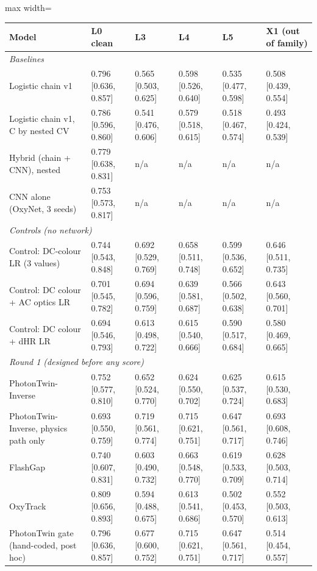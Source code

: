 {\scriptsize
\setlength{\tabcolsep}{2.5pt}
\begin{adjustbox}{max width=\linewidth}
\begin{tabular}{p{3.4cm}lllll}
\toprule
Model & L0 clean & L3 & L4 & L5 & X1 (out of family) \\
\midrule
\multicolumn{6}{l}{\emph{Baselines}} \\
Logistic chain v1 & 0.796 [0.636, 0.857] & 0.565 [0.503, 0.625] & 0.598 [0.526, 0.640] & 0.535 [0.477, 0.598] & 0.508 [0.439, 0.554] \\
Logistic chain v1, C by nested CV & 0.786 [0.596, 0.860] & 0.541 [0.476, 0.606] & 0.579 [0.518, 0.615] & 0.518 [0.467, 0.574] & 0.493 [0.424, 0.539] \\
Hybrid (chain + CNN), nested & 0.779 [0.638, 0.831] & n/a & n/a & n/a & n/a \\
CNN alone (OxyNet, 3 seeds) & 0.753 [0.573, 0.817] & n/a & n/a & n/a & n/a \\
\multicolumn{6}{l}{\emph{Controls (no network)}} \\
Control: DC-colour LR (3 values) & 0.744 [0.543, 0.848] & 0.692 [0.529, 0.769] & 0.658 [0.511, 0.748] & 0.599 [0.536, 0.652] & 0.646 [0.511, 0.735] \\
Control: DC colour + AC optics LR & 0.701 [0.545, 0.782] & 0.694 [0.596, 0.759] & 0.639 [0.581, 0.687] & 0.566 [0.502, 0.638] & 0.643 [0.560, 0.701] \\
Control: DC colour + dHR LR & 0.694 [0.546, 0.793] & 0.613 [0.498, 0.722] & 0.615 [0.540, 0.666] & 0.590 [0.517, 0.684] & 0.580 [0.469, 0.665] \\
\multicolumn{6}{l}{\emph{Round 1 (designed before any score)}} \\
PhotonTwin-Inverse & 0.752 [0.577, 0.810] & 0.652 [0.524, 0.770] & 0.624 [0.550, 0.702] & 0.625 [0.537, 0.724] & 0.615 [0.530, 0.683] \\
PhotonTwin-Inverse, physics path only & 0.693 [0.550, 0.759] & 0.719 [0.561, 0.774] & 0.715 [0.621, 0.751] & 0.647 [0.561, 0.717] & 0.693 [0.608, 0.746] \\
FlashGap & 0.740 [0.607, 0.831] & 0.603 [0.490, 0.732] & 0.663 [0.548, 0.770] & 0.619 [0.533, 0.709] & 0.628 [0.503, 0.714] \\
OxyTrack & 0.809 [0.656, 0.893] & 0.594 [0.488, 0.675] & 0.613 [0.541, 0.686] & 0.502 [0.453, 0.570] & 0.552 [0.503, 0.613] \\
PhotonTwin gate (hand-coded, post hoc) & 0.796 [0.636, 0.857] & 0.677 [0.600, 0.752] & 0.715 [0.621, 0.751] & 0.647 [0.561, 0.717] & 0.514 [0.454, 0.557] \\

\end{tabular}
\end{adjustbox}}
